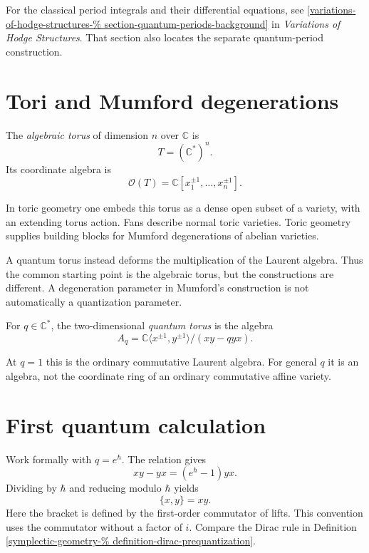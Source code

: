 For the classical period integrals and
their differential equations, see
\ref{variations-of-hodge-structures-%
section-quantum-periods-background}
in {\it Variations of Hodge Structures}.
That section also locates the separate
quantum-period construction.

\section{Tori and Mumford degenerations}
\label{section-tori-and-mumford}

\begin{definition}
\label{definition-algebraic-torus}
The \textit{algebraic torus} of
dimension $n$ over $\mathbb{C}$ is
$$
T=(\mathbb{C}^{*})^n.
$$
Its coordinate algebra is
$$
\mathcal{O}(T)=
\mathbb{C}[x_1^{\pm1},\ldots,x_n^{\pm1}].
$$
\end{definition}

\noindent
In toric geometry one embeds this torus
as a dense open subset of a variety,
with an extending torus action.
Fans describe normal toric varieties.
Toric geometry supplies building blocks
for Mumford degenerations of abelian
varieties.

A quantum torus instead deforms the
multiplication of the Laurent algebra.
Thus the common starting point is the
algebraic torus, but the constructions
are different. A degeneration parameter
in Mumford's construction is not
automatically a quantization parameter.

\begin{definition}
\label{definition-quantum-torus}
For $q\in\mathbb{C}^{*}$, the
two-dimensional \textit{quantum torus}
is the algebra
$$
A_q=
\mathbb{C}\langle x^{\pm1},y^{\pm1}\rangle
/(xy-qyx).
$$
\end{definition}

\noindent
At $q=1$ this is the ordinary
commutative Laurent algebra.
For general $q$ it is an algebra,
not the coordinate ring of an ordinary
commutative affine variety.

\section{First quantum calculation}
\label{section-first-quantum-calculation}

\noindent
Work formally with $q=e^\hbar$.
The relation gives
$$
xy-yx=(e^\hbar-1)yx.
$$
Dividing by $\hbar$ and reducing
modulo $\hbar$ yields
$$
\{x,y\}=xy.
$$
Here the bracket is defined by the
first-order commutator of lifts.
This convention uses the commutator
without a factor of $i$.
Compare the Dirac rule in Definition
\ref{symplectic-geometry-%
definition-dirac-prequantization}.

